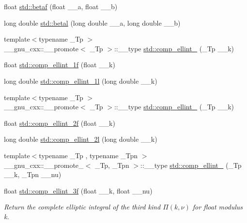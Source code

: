 \begin{DoxyCompactItemize}
\item 
float \hyperlink{group__tr29124__math__spec__func_ga12dc61ee4c09172151cf092ed387e203}{std\+::betaf} (float \+\_\+\+\_\+a, float \+\_\+\+\_\+b)
\item 
long double \hyperlink{group__tr29124__math__spec__func_ga8caca1cef099f41a88111209c36ce06c}{std\+::betal} (long double \+\_\+\+\_\+a, long double \+\_\+\+\_\+b)
\item 
{\footnotesize template$<$typename \+\_\+\+Tp $>$ }\\\+\_\+\+\_\+gnu\+\_\+cxx\+::\+\_\+\+\_\+promote$<$ \+\_\+\+Tp $>$\+::\+\_\+\+\_\+type \hyperlink{group__tr29124__math__spec__func_gac559500c604c43ea943d593c9ad9d289}{std\+::comp\+\_\+ellint\+\_} (\+\_\+\+Tp \+\_\+\+\_\+k)
\item 
float \hyperlink{group__tr29124__math__spec__func_ga7fb5be999a8125cf7e55e630eb8444a1}{std\+::comp\+\_\+ellint\+\_\+1f} (float \+\_\+\+\_\+k)
\item 
long double \hyperlink{group__tr29124__math__spec__func_ga7247d3dd77c1ff5df3c059fed862dc48}{std\+::comp\+\_\+ellint\+\_\+1l} (long double \+\_\+\+\_\+k)
\item 
{\footnotesize template$<$typename \+\_\+\+Tp $>$ }\\\+\_\+\+\_\+gnu\+\_\+cxx\+::\+\_\+\+\_\+promote$<$ \+\_\+\+Tp $>$\+::\+\_\+\+\_\+type \hyperlink{group__tr29124__math__spec__func_ga22fcc678829f0daf2de257896378e7e0}{std\+::comp\+\_\+ellint\+\_} (\+\_\+\+Tp \+\_\+\+\_\+k)
\item 
float \hyperlink{group__tr29124__math__spec__func_ga21700f2f125c42b1f1da1f9c7eea1135}{std\+::comp\+\_\+ellint\+\_\+2f} (float \+\_\+\+\_\+k)
\item 
long double \hyperlink{group__tr29124__math__spec__func_ga47b647ec386c8d4b18a030c97842df18}{std\+::comp\+\_\+ellint\+\_\+2l} (long double \+\_\+\+\_\+k)
\item 
{\footnotesize template$<$typename \+\_\+\+Tp , typename \+\_\+\+Tpn $>$ }\\\+\_\+\+\_\+gnu\+\_\+cxx\+::\+\_\+\+\_\+promote\+\_$<$ \+\_\+\+Tp, \+\_\+\+Tpn $>$\+::\+\_\+\+\_\+type \hyperlink{group__tr29124__math__spec__func_gad833404645e24b7f0598a640ff92d623}{std\+::comp\+\_\+ellint\+\_} (\+\_\+\+Tp \+\_\+\+\_\+k, \+\_\+\+Tpn \+\_\+\+\_\+nu)
\item 
float \hyperlink{group__tr29124__math__spec__func_ga76834d3112f777703330892303267a39}{std\+::comp\+\_\+ellint\+\_\+3f} (float \+\_\+\+\_\+k, float \+\_\+\+\_\+nu)
\begin{DoxyCompactList}\small\item\em Return the complete elliptic integral of the third kind $ \Pi(k,\nu) $ for {\ttfamily float} modulus {\ttfamily k}. \end{DoxyCompactList}\item 

\end{DoxyCompactItemize}
